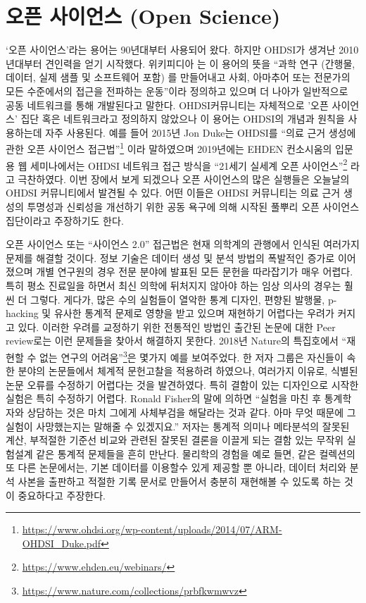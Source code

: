 \documentclass[11pt]{book}
\let\rmarkdownfootnote\footnote%
\def\footnote{\protect\rmarkdownfootnote}
\theoremstyle{definition}
\theoremstyle{definition}
\theoremstyle{definition}
\theoremstyle{remark}
\begin{document}
\section{오픈 사이언스 (Open Science)}\label{--open-science}

`오픈 사이언스'라는 용어는 90년대부터 사용되어 왔다. 하지만 OHDSI가
생겨난 2010년대부터 견인력을 얻기 시작했다. 위키피디아
\citep{wiki:Open_science} 는 이 용어의 뜻을 ``과학 연구 (간행물, 데이터,
실제 샘플 및 소프트웨어 포함) 를 만들어내고 사회, 아마추어 또는 전문가의
모든 수준에서의 접근을 전파하는 운동''이라 정의하고 있으며 더 나아가
일반적으로 공동 네트워크를 통해 개발된다고 말한다. OHDSI커뮤니티는
자체적으로 '오픈 사이언스' 집단 혹은 네트워크라고 정의하지 않았으나 이
용어는 OHDSI의 개념과 원칙을 사용하는데 자주 사용된다. 예를 들어 2015년
Jon Duke는 OHDSI를 ``의료 근거 생성에 관한 오픈 사이언스
접근법''\footnote{\url{https://www.ohdsi.org/wp-content/uploads/2014/07/ARM-OHDSI_Duke.pdf}}
이라 말하였으며 2019년에는 EHDEN 컨소시움의 입문용 웹 세미나에서는 OHDSI
네트워크 접근 방식을 ``21세기 실세계 오픈 사이언스''\footnote{\url{https://www.ehden.eu/webinars/}}
라고 극찬하였다. 이번 장에서 보게 되겠으나 오픈 사이언스의 많은 실행들은
오늘날의 OHDSI 커뮤니티에서 발견될 수 있다. 어떤 이들은 OHDSI 커뮤니티는
의료 근거 생성의 투명성과 신뢰성을 개선하기 위한 공동 욕구에 의해 시작된
풀뿌리 오픈 사이언스 집단이라고 주장하기도 한다.

오픈 사이언스 또는 ``사이언스 2.0'' \citep{wiki:Science_2.0} 접근법은
현재 의학계의 관행에서 인식된 여러가지 문제를 해결할 것이다. 정보 기술은
데이터 생성 및 분석 방법의 폭발적인 증가로 이어졌으며 개별 연구원의 경우
전문 분야에 발표된 모든 문헌을 따라잡기가 매우 어렵다. 특히 평소
진료일을 하면서 최신 의학에 뒤처지지 않아야 하는 임상 의사의 경우는 훨씬
더 그렇다. 게다가, 많은 수의 실험들이 열악한 통계 디자인, 편향된 발행물,
p-hacking 및 유사한 통계적 문제로 영향을 받고 있으며 재현하기 어렵다는
우려가 커지고 있다. 이러한 우려를 교정하기 위한 전통적인 방법인 출간된
논문에 대한 Peer review로는 이런 문제들을 찾아서 해결하지 못한다. 2018년
Nature의 특집호에서 ``재현할 수 없는 연구의 어려움''\footnote{\url{https://www.nature.com/collections/prbfkwmwvz}}은
몇가지 예를 보여주었다. 한 저자 그룹은 자신들이 속한 분야의 논문들에서
체계적 문헌고찰을 적용하려 하였으나, 여러가지 이유로, 식별된 논문 오류를
수정하기 어렵다는 것을 발견하였다. 특히 결함이 있는 디자인으로 시작한
실험은 특히 수정하기 어렵다. Ronald Fisher의 말에 의하면 ``실험을 마친
후 통계학자와 상담하는 것은 마치 그에게 사체부검을 해달라는 것과 같다.
아마 무엇 때문에 그 실험이 사망했는지는 말해줄 수 있겠지요.''
\citep{wikiquote:Ronald_Fisher} 저자는 통계적 의미나 메타분석의 잘못된
계산, 부적절한 기준선 비교와 관련된 잘못된 결론을 이끌게 되는 결함 있는
무작위 실험설계 같은 통계적 문제들을 흔히 만난다. \citep{allison_2016}
물리학의 경험을 예로 들면, 같은 컬렉션의 또 다른 논문에서는, 기본
데이터를 이용할수 있게 제공할 뿐 아니라, 데이터 처리와 분석 사본을
출판하고 적절한 기록 문서로 만들어서 충분히 재현해볼 수 있도록 하는 것이
중요하다고 주장한다. \citep{Chen2018}
\end{document}
